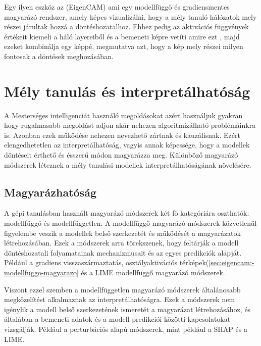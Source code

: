 \documentclass[12pt,oneside,a4paper]{article}
\newcommand{\newsection}[1]{\clearpage\section{#1}}\label{makro}
\theoremstyle{remark}
\begin{document}
    Egy ilyen eszköz az  (\gls{EigenCAM}) ami egy modellfüggő és gradiensmentes magyarázó rendszer,
    amely képes vizualizálni, hogy a mély tanuló hálózatok mely részei járultak hozzá a döntéshozatalhoz.
    Ehhez pedig
    az aktivációs függvények értékeit kiemeli a háló layereiből és a bemeneti képre vetíti amire ezt , majd ezeket kombinálja
    egy képpé, megmutatva azt, hogy a kép mely részei milyen fontosak a döntések meghozásában.

\newsection{Mély tanulás és interpretálhatóság}\label{sec:mely-tanulas-es-interpretalhatosag}
A Mesterséges intelligenciát használó megoldásokat azért használjuk gyakran hogy rugalmasabb megoldást adjon akár
nehezen algoritmizálható problémáinkra is.
Azonban ezek működése nehezen nevezhető zártnak és kauzálisnak.
 Ezért elengedhetetlen az interpretálhatóság, vagyis annak képessége, hogy a modellek
döntéseit érthető és ésszerű módon magyarázza meg.
    Különböző magyarázó módszerek léteznek a mély tanulási modellek interpretálhatóságának növelésére.
\subsection{Magyarázhatóság}
A gépi tanulásban használt magyarázó módszerek két fő kategóriára oszthatók: modellfüggő és modellfüggetlen. A modellfüggő magyarázó módszerek közvetlenül figyelembe veszik a modellek belső szerkezetét és működését a magyarázatok létrehozásában. Ezek a módszerek arra törekszenek, hogy feltárják a modell döntéshozatali folyamatainak mechanizmusait és az egyes predikciók alapját. Például a gradiens visszaszármaztatás, osztályaktivációs térképek(\ref{sec:eigencam:-modellfuggo-magyarazo}\label{sechiv} és a LIME modellfüggő magyarázó módszerek.

Viszont ezzel szemben a modellfüggetlen magyarázó módszerek általánosabb megközelítést alkalmaznak az interpretálhatóságra. Ezek a módszerek nem igénylik a modell belső szerkezetének ismeretét a magyarázat létrehozásához, és általában a bemeneti adatok és a modell predikciói közötti kapcsolatokat vizsgálják. Például a perturbációs alapú módszerek, mint például a SHAP és a LIME.
\end{document}
